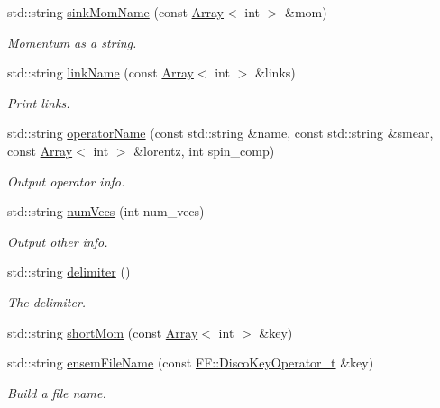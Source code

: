 \begin{DoxyCompactItemize}
std\+::string \mbox{\hyperlink{namespaceHadron_aaa6ace3b1a5c63de278a8bcb9fa80c49}{sink\+Mom\+Name}} (const \mbox{\hyperlink{classXMLArray_1_1Array}{Array}}$<$ int $>$ \&mom)
\begin{DoxyCompactList}\small\item\em Momentum as a string. \end{DoxyCompactList}\item 
std\+::string \mbox{\hyperlink{namespaceHadron_afbb540812e62aedb8826e62c56efcff8}{link\+Name}} (const \mbox{\hyperlink{classXMLArray_1_1Array}{Array}}$<$ int $>$ \&links)
\begin{DoxyCompactList}\small\item\em Print links. \end{DoxyCompactList}\item 
std\+::string \mbox{\hyperlink{namespaceHadron_a8f8a77c02a6415ffc31d2a300f59e6a6}{operator\+Name}} (const std\+::string \&name, const std\+::string \&smear, const \mbox{\hyperlink{classXMLArray_1_1Array}{Array}}$<$ int $>$ \&lorentz, int spin\+\_\+comp)
\begin{DoxyCompactList}\small\item\em Output operator info. \end{DoxyCompactList}\item 
std\+::string \mbox{\hyperlink{namespaceHadron_afea9ddb2112da9cb61d87881799fff49}{num\+Vecs}} (int num\+\_\+vecs)
\begin{DoxyCompactList}\small\item\em Output other info. \end{DoxyCompactList}\item 
std\+::string \mbox{\hyperlink{namespaceHadron_a2ea4a74b346adec57d30f2605fc00005}{delimiter}} ()
\begin{DoxyCompactList}\small\item\em The delimiter. \end{DoxyCompactList}\item 
std\+::string \mbox{\hyperlink{namespaceHadron_aaaec62d26ea28ccc4d611b4797a1d667}{short\+Mom}} (const \mbox{\hyperlink{classXMLArray_1_1Array}{Array}}$<$ int $>$ \&key)
\item 
std\+::string \mbox{\hyperlink{namespaceHadron_ae52edd7538c484e9f1c59f65a1d010ca}{ensem\+File\+Name}} (const \mbox{\hyperlink{structFF_1_1DiscoKeyOperator__t}{F\+F\+::\+Disco\+Key\+Operator\+\_\+t}} \&key)
\begin{DoxyCompactList}\small\item\em Build a file name. \end{DoxyCompactList}\item 

\end{DoxyCompactItemize}
